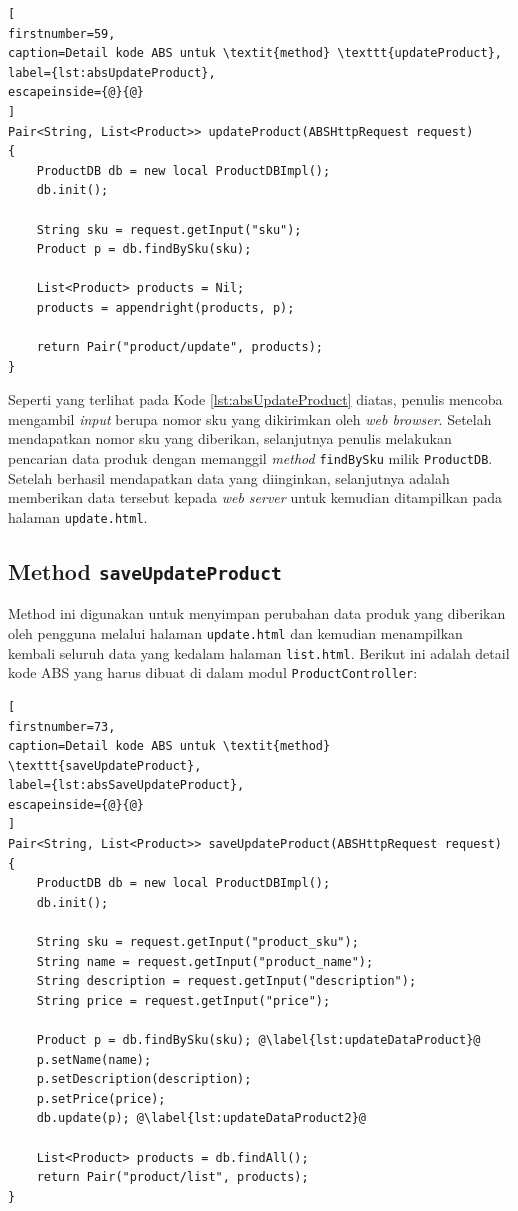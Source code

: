 \begin{lstlisting}[
firstnumber=59,
caption=Detail kode ABS untuk \textit{method} \texttt{updateProduct},
label={lst:absUpdateProduct},
escapeinside={@}{@}
]
Pair<String, List<Product>> updateProduct(ABSHttpRequest request)
{
	ProductDB db = new local ProductDBImpl();
	db.init();
	
	String sku = request.getInput("sku");
	Product p = db.findBySku(sku);
	
	List<Product> products = Nil;
	products = appendright(products, p);
	
	return Pair("product/update", products);
}
\end{lstlisting}

Seperti yang terlihat pada Kode \ref{lst:absUpdateProduct} diatas, penulis mencoba mengambil \textit{input} berupa nomor sku yang dikirimkan oleh \textit{web browser}. Setelah mendapatkan nomor sku yang diberikan, selanjutnya penulis melakukan pencarian data produk dengan memanggil \textit{method} \texttt{findBySku} milik \texttt{ProductDB}. Setelah berhasil mendapatkan data yang diinginkan, selanjutnya adalah memberikan data tersebut kepada \textit{web server} untuk kemudian ditampilkan pada halaman \texttt{update.html}.

\subsection{Method \texttt{saveUpdateProduct}}

Method ini digunakan untuk menyimpan perubahan data produk yang diberikan oleh pengguna melalui halaman \texttt{update.html} dan kemudian menampilkan kembali seluruh data yang kedalam halaman \texttt{list.html}. Berikut ini adalah detail kode ABS yang harus dibuat di dalam modul \texttt{ProductController}:

\begin{lstlisting}[
firstnumber=73,
caption=Detail kode ABS untuk \textit{method} \texttt{saveUpdateProduct},
label={lst:absSaveUpdateProduct},
escapeinside={@}{@}
]
Pair<String, List<Product>> saveUpdateProduct(ABSHttpRequest request)
{
	ProductDB db = new local ProductDBImpl();
	db.init();
	
	String sku = request.getInput("product_sku");
	String name = request.getInput("product_name");
	String description = request.getInput("description");
	String price = request.getInput("price");
	
	Product p = db.findBySku(sku); @\label{lst:updateDataProduct}@
	p.setName(name);
	p.setDescription(description);
	p.setPrice(price);
	db.update(p); @\label{lst:updateDataProduct2}@
	
	List<Product> products = db.findAll();
	return Pair("product/list", products);
}
\end{lstlisting}

